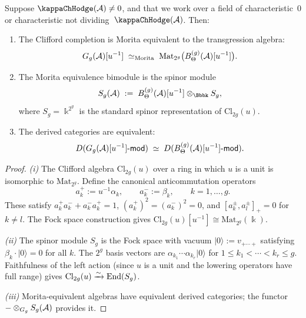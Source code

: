 \begin{theorem}
Suppose $\kappaChHodge(\cA) \neq 0$, and that we work over a field
of characteristic~$0$ or characteristic not
dividing~$\kappaChHodge(\cA)$. Then:
\begin{enumerate}[label=\textup{(\roman*)}]
\item The Clifford completion is Morita equivalent to the
transgression algebra:
\begin{equation}%
G_g(\cA)[u^{-1}]
\;\simeq_{\mathrm{Morita}}\;
\mathrm{Mat}_{2^g}\bigl(B_\Theta^{(g)}(\cA)[u^{-1}]\bigr).
\end{equation}

\item The Morita equivalence bimodule is the spinor module
\begin{equation}%
S_g(\cA)
\;:=\;
B_\Theta^{(g)}(\cA)[u^{-1}] \otimes_\Bbbk S_g,
\end{equation}
where $S_g = \Bbbk^{2^g}$ is the standard spinor representation of
$\mathrm{Cl}_{2g}(u)$.

\item The derived categories are equivalent:
\begin{equation}%
D(G_g(\cA)[u^{-1}]\text{-}\mathsf{mod})
\;\simeq\;
D(B_\Theta^{(g)}(\cA)[u^{-1}]\text{-}\mathsf{mod}).
\end{equation}
\end{enumerate}
\end{theorem}

\begin{proof}
\emph{(i)} The Clifford algebra $\mathrm{Cl}_{2g}(u)$ over a ring in
which $u$ is a unit is isomorphic to $\mathrm{Mat}_{2^g}$. Define the
canonical anticommutation operators
\begin{equation}%
a_k^+ := u^{-1}\alpha_k,
\qquad
a_k^- := \beta_k,
\qquad k = 1, \ldots, g.
\end{equation}
These satisfy $a_k^+ a_k^- + a_k^- a_k^+ = 1$,
$(a_k^+)^2 = (a_k^-)^2 = 0$, and $[a_k^\pm, a_l^\pm]_+ = 0$ for
$k \neq l$. The Fock space construction gives
$\mathrm{Cl}_{2g}(u)[u^{-1}] \cong \mathrm{Mat}_{2^g}(\Bbbk)$.

\emph{(ii)} The spinor module $S_g$ is the Fock space with vacuum
$|0\rangle := v_{+\cdots+}$ satisfying $\beta_k \cdot |0\rangle = 0$
for all $k$. The $2^g$ basis vectors are
$\alpha_{k_1}\cdots\alpha_{k_r}|0\rangle$ for
$1 \leq k_1 < \cdots < k_r \leq g$. Faithfulness of the left action
(since $u$ is a unit and the lowering operators have full range) gives
$\mathrm{Cl}_{2g}(u) \xrightarrow{\sim} \operatorname{End}(S_g)$.

\emph{(iii)} Morita-equivalent algebras have equivalent derived
categories; the functor $- \otimes_{G_g} S_g(\mathcal{A})$ provides it.
\end{proof}

